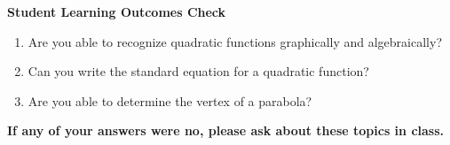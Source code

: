 \noindent \textbf{Student Learning Outcomes Check}

\begin{enumerate}
\item Are you able to recognize quadratic functions graphically and algebraically?
\item Can you write the standard equation for a quadratic function?
\item Are you able to determine the vertex of a parabola?


\end{enumerate}

\noindent \textbf{If any of your answers were no, please ask about these topics in class.}


